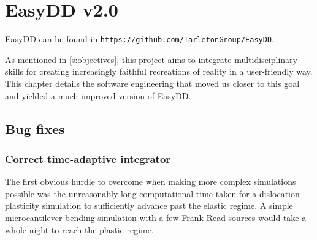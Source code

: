 \chapter{EasyDD v2.0}
\label{c:easydd}

EasyDD can be found in \href{https://github.com/TarletonGroup/EasyDD}{\texttt{https://github.com/TarletonGroup/EasyDD}}.

As mentioned in \cref{s:objectives}, this project aims to integrate multidisciplinary skills for creating increasingly faithful recreations of reality in a user-friendly way. This chapter details the software engineering that moved us closer to this goal and yielded a much improved version of EasyDD.

\section{Bug fixes}
\label{s:bugs}

\subsection{Correct time-adaptive integrator}
\label{ss:integrator}

The first obvious hurdle to overcome when making more complex simulations possible was the unreasonably long computational time taken for a dislocation plasticity simulation to sufficiently advance past the elastic regime. A simple microcantilever bending simulation with a few Frank-Read sources would take a whole night to reach the plastic regime.

